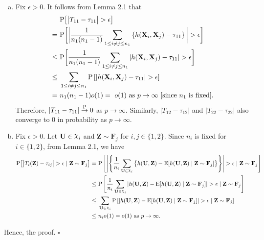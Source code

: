 \documentclass[twoside]{article}
\newcommand{\bX}{\mathbf{X}}
\newcommand{\bZ}{\mathbf{Z}}
\newcommand{\bF}{\mathbf{F}}
\newcommand{\bU}{\mathbf{U}}
\newcommand{\0}{\mathbf{0}}
\newcommand{\1}{\mathbf{1}}
\newcommand*{\QEDB}{\hfill\ensuremath{\square}}
\DeclareRobustCommand{\rchi}{{\mathpalette\irchi\relax}}
\newcommand{\irchi}[2]{\raisebox{\depth}{$#1\chi$}} %
\numberwithin{equation}{section}
\begin{document}
\begin{enumerate}[(a)]
 \item Fix $\epsilon>0$. It follows from Lemma 2.1 that
\begin{align}\label{ref1}
&\ {\rm P}\big [\big |T_{11} - \tau_{11}\big |>\epsilon\big ]\nonumber\\
= &\ {\rm P} \bigg [\bigg |\frac{1}{n_1(n_1-1)}\sum\limits_{1\leq i\neq j\leq n_1}\left\{{h}(\bX_{i},\bX_{j})-\tau_{11}\right\}\bigg |>\epsilon \bigg]\nonumber\\
\leq &\ {\rm P} \bigg [\frac{1}{n_1(n_1-1)}\sum\limits_{1\leq i\neq j\leq n_1}\left |{h}(\bX_{i},\bX_{j}) -\tau_{11}\right |>\epsilon \bigg]\nonumber \\
\leq &\ \sum\limits_{1\leq i\neq j\leq n_1}{\rm P} \left [\left |{h}(\bX_{i},\bX_{j}) -\tau_{11}\right |>\epsilon \right]\nonumber\\
=&\ n_1(n_1-1)o(1)=\ o(1)\text{ as }p\to\infty\ [\text{since $n_1$ is fixed}].
\end{align}
Therefore, $|T_{11}-\tau_{11}|\stackrel{\rm P}{\to}0$ as $p\to\infty$. Similarly, $|T_{12}-\tau_{12}|$ and $|T_{22}-\tau_{22}|$ also converge to 0 in probability as $p\to\infty$.
\item Fix $\epsilon>0$. Let $\bU\in\rchi_i$ and $\bZ\sim\bF_j$ for $i,j\in\{1,2\}$. Since $n_i$ is fixed for $i\in\{1,2\}$, from Lemma 2.1, we have
\begin{align}\label{ref3}
{\rm P}\big [\big |T_{i}(\bZ) - \tau_{ij}\big |>\epsilon\mid\bZ\sim\bF_j\big ]
=&\  {\rm P}\left [\left |\left \{\frac{1}{n_i}\sum_{\bU\in\rchi_i}\big \{h(\bU,\bZ) - {\rm E}[h(\bU,\bZ)\mid\bZ\sim\bF_j]\big \}\right \}\right |>\epsilon\mid\bZ\sim\bF_j \right ]\nonumber\\
\leq &\ {\rm P}\left [\frac{1}{n_i}\sum_{\bU\in\rchi_i}\left |h(\bU,\bZ) - {\rm E}[h(\bU,\bZ)\mid\bZ\sim\bF_j]\right |>\epsilon \mid\bZ\sim\bF_j\right ]\nonumber \\
\leq &\ \sum_{\bU\in\rchi_i}{\rm P}\left [\left |h(\bU,\bZ) - {\rm E}[h(\bU,\bZ)\mid\bZ\sim\bF_j]\right |>\epsilon \mid\bZ\sim\bF_j\right ]\nonumber \\
\leq &\ n_io(1)=o(1)\text{ as }p\to\infty.
\end{align}
\end{enumerate}
Hence, the proof. \hfill \QEDB\newline
\end{document}
